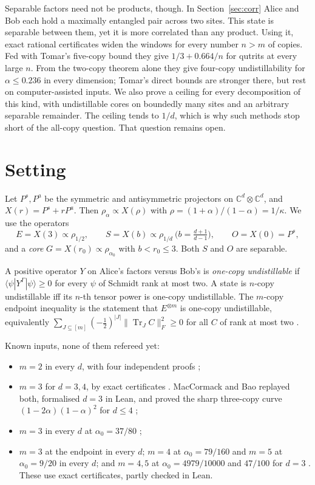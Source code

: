 \documentclass[11pt]{article}
\theoremstyle{remark}
\newcommand{\Tr}{\operatorname{Tr}}
\begin{document}
Separable factors need not be products, though. In Section~\ref{sec:corr} Alice and Bob each hold a maximally
entangled pair across two sites. This state is separable between them, yet it is more correlated than any product.
Using it, exact rational certificates widen the windows for every number $n>m$ of copies. Fed with Tomar's five-copy bound
they give $1/3+0.664/n$ for qutrits at every large $n$. From the two-copy theorem alone they give four-copy
undistillability for $\alpha\le0.236$ in every dimension; Tomar's direct bounds are stronger there, but rest on
computer-assisted inputs. We also
prove a ceiling for every decomposition of this kind, with undistillable cores on boundedly many sites and an
arbitrary separable remainder. The ceiling tends to $1/d$, which is why such methods stop short of the all-copy
question. That question remains open.

\section{Setting}
Let $P^s,P^a$ be the symmetric and antisymmetric projectors on $\mathbb C^d\otimes\mathbb C^d$, and $X(r)=P^s+rP^a$.
Then $\rho_\alpha\propto X(\rho)$ with $\rho=(1+\alpha)/(1-\alpha)=1/\kappa$. We use the operators
\[
E=X(3)\propto\rho_{1/2},\qquad S=X(b)\propto\rho_{1/d}\ \Big(b=\tfrac{d+1}{d-1}\Big),\qquad O=X(0)=P^s,
\]
and a \emph{core} $G=X(r_0)\propto\rho_{\alpha_0}$ with $b<r_0\le3$. Both $S$ and $O$ are separable.

A positive operator $Y$ on Alice's factors versus Bob's is \emph{one-copy undistillable} if
$\langle\psi|Y^\Gamma|\psi\rangle\ge0$ for every $\psi$ of Schmidt rank at most two. A state is $n$-copy undistillable
iff its $n$-th tensor power is one-copy undistillable. The $m$-copy endpoint inequality is the statement that
$E^{\otimes m}$ is one-copy undistillable, equivalently $\sum_{J\subseteq[m]}(-\tfrac12)^{|J|}\|\Tr_JC\|_F^2\ge0$ for
all $C$ of rank at most two \cite{SongChen}.

Known inputs, none of them refereed yet:
\begin{itemize}
\item $m=2$ in every $d$, with four independent proofs \cite{FGP,SongChen,FHPV,BGH};
\item $m=3$ for $d=3,4$, by exact certificates \cite{AnonD3,LiuD4}. MacCormack and Bao replayed both, formalised $d=3$ in Lean, and proved the sharp three-copy curve $(1-2\alpha)(1-\alpha)^2$ for $d\le4$ \cite[Thm.~1.2]{MB};
\item $m=3$ in every $d$ at $\alpha_0=37/80$ \cite[Thm.~1.3]{MB};
\item $m=3$ at the endpoint in every $d$; $m=4$ at $\alpha_0=79/160$ and $m=5$ at $\alpha_0=9/20$ in every $d$; and
$m=4,5$ at $\alpha_0=4979/10000$ and $47/100$ for $d=3$ \cite{Tomar}. These use exact certificates, partly checked
in Lean.
\end{itemize}
\end{document}
